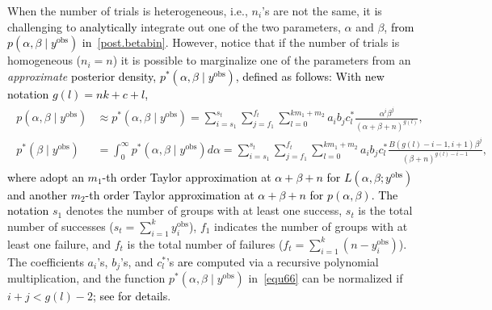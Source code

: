 \documentclass[12pt]{article}
\begin{document}
When the number of trials is heterogeneous, i.e., $n_i$'s are not the same, it is  challenging to \textcolor{black}{analytically} integrate out one of the two parameters, $\alpha$ and $\beta$, \textcolor{black}{from $p(\alpha, \beta\mid y^{\textrm{obs}})$ in~\eqref{post.betabin}}. However, \cite{everson2002betabin} notice that if the number of trials is homogeneous ($n_i=n$) it is possible to marginalize one of the parameters from an \emph{approximate} \textcolor{black}{posterior density, $p^\ast(\alpha, \beta\mid y^{\textrm{obs}})$, defined as follows: With new notation $g(l)=nk+c+l$,}
\begin{align}
\begin{aligned}\label{equ66}
p(\alpha, \beta\mid y^{\textrm{obs}})&\approx p^\ast(\alpha, \beta\mid y^{\textrm{obs}})= \sum_{i=s_1}^{s_t}\sum_{j=f_1}^{f_t} \sum_{l=0}^{km_1+m_2}a_ib_jc^\ast_l\frac{\alpha^i\beta^j}{(\alpha+\beta+n)^{g(l)}},\\
p^\ast(\beta\mid y^{\textrm{obs}})&=\int_0^{\infty}\!\!p^\ast(\alpha, \beta\mid y^{\textrm{obs}})d\alpha=\sum_{i=s_1}^{s_t}\sum_{j=f_1}^{f_t} \sum_{l=0}^{km_1+m_2}a_ib_jc^\ast_l\frac{B(g(l)-i-1, i+1)\beta^j}{(\beta+n)^{g(l)-i-1}},
\end{aligned}
\end{align}
\textcolor{black}{where \cite{everson2002betabin} adopt an $m_1$-th order Taylor approximation at $\alpha+\beta+n$ for $L(\alpha, \beta; y^{\textrm{obs}})$ and another $m_2$-th order Taylor approximation at $\alpha+\beta+n$ for $p(\alpha, \beta)$. The notation} $s_1$ denotes the number of groups with at least one success, $s_t$ is the total number of successes ($s_t=\sum_{i=1}^ky_i^{\textrm{obs}}$), $f_1$ indicates the number of groups with at least one failure, and $f_t$ is the total number of failures ($f_t=\sum_{i=1}^k (n-y_i^{\textrm{obs}})$).  The coefficients $a_i$'s, $b_j$'s, and $c^\ast_l$'s  \textcolor{black}{are} computed via a recursive polynomial multiplication, and the function $p^\ast(\alpha, \beta\mid y^{\textrm{obs}})$ in~\eqref{equ66} can be normalized if $i+j<g(l)-2$\textcolor{black}{; see \cite{everson2002betabin} for details}.
\end{document}
